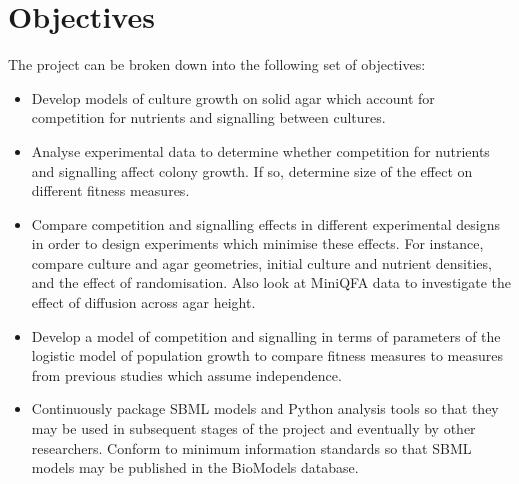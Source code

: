
\section{Objectives}
\label{sec:objectives}
The project can be broken down into the following set of objectives:
\begin{itemize}
\item Develop models of culture growth on solid agar which account for
  competition for nutrients and signalling between cultures.
\item Analyse experimental data to determine whether competition for nutrients and signalling
  affect colony growth. If so, determine size of the effect on different fitness measures.
\item Compare competition and signalling effects in different
  experimental designs in order to design experiments which minimise
  these effects. For instance, compare culture and agar geometries,
  initial culture and nutrient densities, and the effect of randomisation. Also
  look at MiniQFA data to investigate the effect of diffusion across agar height.
\item Develop a model of competition and signalling in terms of
  parameters of the logistic model of population growth to compare
  fitness measures to measures from previous studies which assume
  independence.
\item Continuously package SBML models and Python analysis tools so
  that they may be used in subsequent stages of the project and
  eventually by other researchers. Conform to minimum information standards so
  that SBML models may be published in the BioModels database.
\end{itemize}

